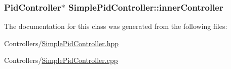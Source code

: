 \subsubsection[{\texorpdfstring{inner\+Controller}{innerController}}]{\setlength{\rightskip}{0pt plus 5cm}Pid\+Controller$\ast$ Simple\+Pid\+Controller\+::inner\+Controller\hspace{0.3cm}{\ttfamily [protected]}}\hypertarget{classSimplePidController_ab46e7126d3eb60e4f492de4f6da051e2}{}\label{classSimplePidController_ab46e7126d3eb60e4f492de4f6da051e2}


The documentation for this class was generated from the following files\+:\begin{DoxyCompactItemize}
\item 
Controllers/\hyperlink{SimplePidController_8hpp}{Simple\+Pid\+Controller.\+hpp}\item 
Controllers/\hyperlink{SimplePidController_8cpp}{Simple\+Pid\+Controller.\+cpp}\end{DoxyCompactItemize}
